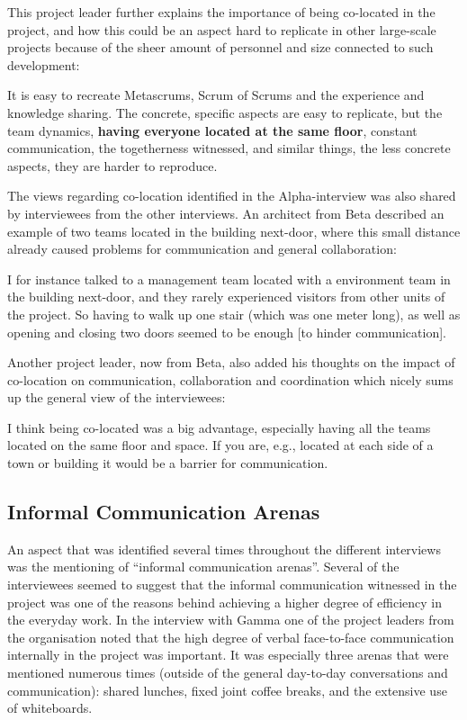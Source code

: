 This project leader further explains the importance of being co-located in the project, and how this could be an aspect hard to replicate in other large-scale projects because of the sheer amount of personnel and size connected to such development:

\begin{fancyquotes}
It is easy to recreate Metascrums, Scrum of Scrums and the experience and knowledge sharing. The concrete, specific aspects are easy to replicate, but the team dynamics, \textbf{having everyone located at the same floor}, constant communication, the togetherness witnessed, and similar things, the less concrete aspects, they are harder to reproduce.
\end{fancyquotes}

The views regarding co-location identified in the Alpha-interview was also shared by interviewees from the other interviews. An architect from Beta described an example of two teams located in the building next-door, where this small distance already caused problems for communication and general collaboration:

\begin{fancyquotes}
I for instance talked to a management team located with a environment team in the building next-door, and they rarely experienced visitors from other units of the project. So having to walk up one stair (which was one meter long), as well as opening and closing two doors seemed to be enough [to hinder communication].
\end{fancyquotes}

Another project leader, now from Beta, also added his thoughts on the impact of co-location on communication, collaboration and coordination which nicely sums up the general view of the interviewees:

\begin{fancyquotes}
I think being co-located was a big advantage, especially having all the teams located on the same floor and space. If you are, e.g., located at each side of a town or building it would be a barrier for communication.
\end{fancyquotes}

\subsection{Informal Communication Arenas}

An aspect that was identified several times throughout the different interviews was the mentioning of ``informal communication arenas''. Several of the interviewees seemed to suggest that the informal communication witnessed in the project was one of the reasons behind achieving a higher degree of efficiency in the everyday work. In the interview with Gamma one of the project leaders from the organisation noted that the high degree of verbal face-to-face communication internally in the project was important. It was especially three arenas that were mentioned numerous times (outside of the general day-to-day conversations and communication): shared lunches, fixed joint coffee breaks, and the extensive use of whiteboards.

